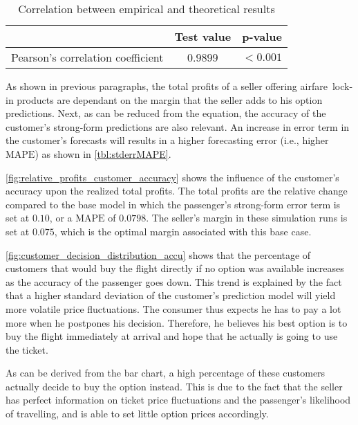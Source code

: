 \begin{table}
\centering
\begin{tabular}{l c c}
\toprule
~  &  Test value  &  p-value  \\
\midrule
Pearson's correlation coefficient   &  0.9899  &  $< 0.001$ \\
\bottomrule
\end{tabular}
\caption{Correlation between empirical and theoretical results}
\label{tbl:pearson_theory_empirical}
\end{table}



As shown in previous paragraphs, the total profits of a seller offering airfare~lock-in products are dependant on the margin that the seller adds to his option predictions. Next, as can be reduced from the equation, the accuracy of the customer's strong-form predictions are also relevant. An increase in error term in the customer's forecasts will results in a higher forecasting error (i.e., higher $\mbox{MAPE}$) as shown in \autoref{tbl:stderrMAPE}.

\autoref{fig:relative_profits_customer_accuracy} shows the influence of the customer's accuracy upon the realized total profits. The total profits are the relative change compared to the base model in which the passenger's strong-form error term is set at $0.10$, or a $\mbox{MAPE}$ of $0.0798$. The seller's margin in these simulation runs is set at $0.075$, which is the optimal margin associated with this base case.


\autoref{fig:customer_decision_distribution_accu} shows that the percentage of customers that would buy the flight directly if no option was available increases as the accuracy of the passenger goes down. This trend is explained by the fact that a higher standard deviation of the customer's prediction model will yield more volatile price fluctuations. The consumer thus expects he has to pay a lot more when he postpones his decision. Therefore, he believes his best option is to buy the flight immediately at arrival and hope that he actually is going to use the ticket.

As can be derived from the bar chart, a high percentage of these customers actually decide to buy the option instead. This is due to the fact that the seller has perfect information on ticket price fluctuations and the passenger's likelihood of travelling, and is able to set little option prices accordingly.

